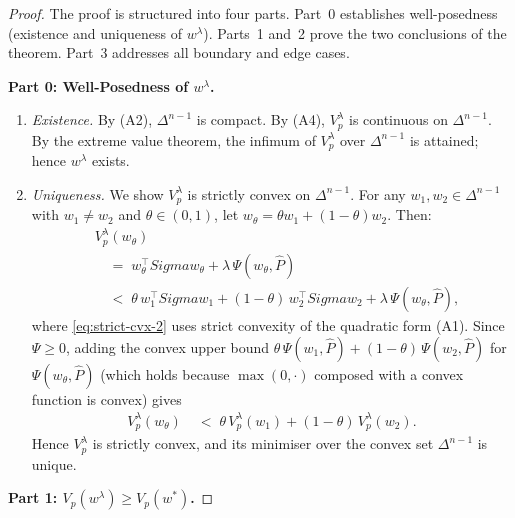 \documentclass[12pt,openany]{book}
\newcommand{\bfw}{\mathbf{w}}
\newcommand{\bfSigma}{\boldsymbol{\Sigma}}
\numberwithin{equation}{chapter}
\theoremstyle{plain}
\theoremstyle{definition}
\theoremstyle{remark}
\def\bfw{w}%
\def\bfSigma{Sigma}%
\begin{document}
\begin{proof}
The proof is structured into four parts.  Part~0 establishes
well-posedness (existence and uniqueness of $\bfw^\lambda$).
Parts~1 and~2 prove the two conclusions of the theorem.
Part~3 addresses all boundary and edge cases.

\medskip
\noindent\textbf{Part 0: Well-Posedness of $\bfw^\lambda$.}
\begin{enumerate}
  \item \emph{Existence.}
        By (A2), $\Delta^{n-1}$ is compact.  By (A4), $V_p^\lambda$ is
        continuous on $\Delta^{n-1}$.  By the extreme value theorem,
        the infimum of $V_p^\lambda$ over $\Delta^{n-1}$ is attained;
        hence $\bfw^\lambda$ exists.

  \item \emph{Uniqueness.}
        We show $V_p^\lambda$ is strictly convex on $\Delta^{n-1}$.
        For any $\bfw_1,\bfw_2 \in \Delta^{n-1}$ with
        $\bfw_1 \neq \bfw_2$ and $\theta \in (0,1)$, let
        $\bfw_\theta = \theta\bfw_1 + (1-\theta)\bfw_2$.  Then:
        \begin{align}
          &V_p^\lambda(\bfw_\theta) \nonumber \\
          &\quad=\; \bfw_\theta^\top\bfSigma\bfw_\theta
            + \lambda\,\Psi(\bfw_\theta,\hat{P})
            \label{eq:strict-cvx-1} \\
          &\quad<\; \theta\,\bfw_1^\top\bfSigma\bfw_1
            + (1-\theta)\,\bfw_2^\top\bfSigma\bfw_2
            + \lambda\,\Psi(\bfw_\theta,\hat{P}),
            \label{eq:strict-cvx-2}
        \end{align}
        where \eqref{eq:strict-cvx-2} uses strict convexity of the
        quadratic form (A1).  Since $\Psi \geq 0$, adding the convex
        upper bound $\theta\,\Psi(\bfw_1,\hat{P}) +
        (1-\theta)\,\Psi(\bfw_2,\hat{P})$ for $\Psi(\bfw_\theta,\hat{P})$
        (which holds because $\max(0,\cdot)$ composed with a convex
        function is convex) gives
        \begin{align}
          V_p^\lambda(\bfw_\theta)
          &\;<\; \theta\,V_p^\lambda(\bfw_1)
            + (1-\theta)\,V_p^\lambda(\bfw_2).
            \label{eq:strict-cvx-3}
        \end{align}
        Hence $V_p^\lambda$ is strictly convex, and its minimiser over
        the convex set $\Delta^{n-1}$ is unique.
\end{enumerate}

\medskip
\noindent\textbf{Part 1: $V_p(\bfw^\lambda) \geq V_p(\bfw^*)$.}


\end{proof}
\end{document}
